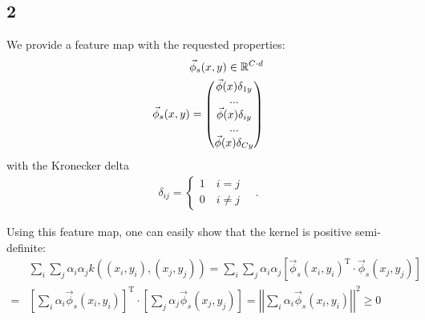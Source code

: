 \subsection*{2}
We provide a feature map with the requested properties:
\begin{align*}
	\vec{\phi}_s(x,y) \in \mathbb{R}^{C\cdot d}\\
\vec{\phi}_s(x,y) = 	\begin{pmatrix}
		\vec{\phi}(x)\delta_{1y}\\...\\\vec{\phi}(x)\delta_{iy}\\...\\ \vec{\phi}(x)\delta_{Cy}
	\end{pmatrix}
\end{align*}
with the Kronecker delta
\begin{align*}
	\delta_{ij} =
	\begin{cases}
		1\quad i = j\\
		0\quad i\neq j	
	\end{cases}\quad .
\end{align*}

Using this feature map, one can easily show that the kernel is positive semi-definite:
\begin{align*}
&\sum_i \sum_j \alpha_i \alpha_j k((x_i,y_i), (x_j,y_j)) = \sum_i \sum_j \alpha_i \alpha_j  \left[\vec{\phi}_s(x_i,y_i)^\text{T}\cdot \vec{\phi}_s(x_j,y_j)\right]\\
	= &\left[\sum_i  \alpha_i  \vec{\phi}_s(x_i,y_i)\right]^\text{T} \cdot \left[\sum_j \alpha_j \vec{\phi}_s(x_j,y_j)\right] = \left|\left|\sum_i  \alpha_i  \vec{\phi}_s(x_i,y_i)\right|\right|^2 \geq 0
\end{align*}